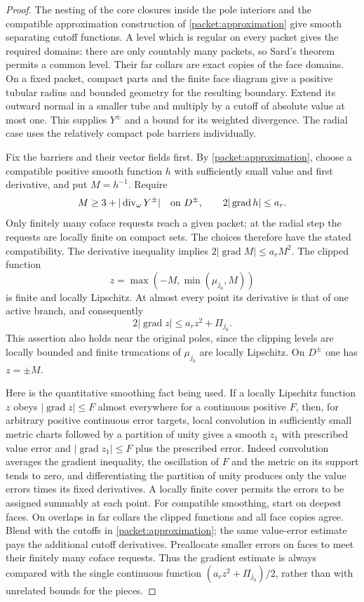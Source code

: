 \documentclass[11pt]{article}
\numberwithin{equation}{section}
\theoremstyle{definition}
\theoremstyle{remark}
\begin{document}
\begin{proof}
The nesting of the core closures inside the pole interiors and the
compatible approximation construction of \cref{packet:approximation}
give smooth separating cutoff functions.  A level which is regular on
every packet gives the required domains: there are only countably many
packets, so Sard's theorem permits a common level.  Their far collars
are exact copies of the face domains.  On a fixed packet, compact parts
and the finite face diagram give a positive tubular radius and bounded
geometry for the resulting boundary.  Extend its outward normal in a
smaller tube and multiply by a cutoff of absolute value at most one.
This supplies $Y^\pm$ and a bound for its weighted divergence.  The radial
case uses the relatively compact pole barriers individually.

Fix the barriers and their vector fields first.  By
\cref{packet:approximation}, choose a compatible positive smooth function
$h$ with sufficiently small value and first derivative, and put $M=h^{-1}$.
Require
\[
 M\ge3+|\operatorname{div}_\omega Y^\pm|\quad\hbox{on }D^\pm,
 \qquad 2|\operatorname{grad} h|\le a_r.
\]
Only finitely many coface requests reach a given packet; at the radial
step the requests are locally finite on compact sets.  The choices
therefore have the stated compatibility.  The derivative inequality implies
$2|\operatorname{grad} M|\le a_rM^2$.  The clipped function
\[
                  z=\max(-M,\min(\mu_{j_0},M))
\]
is finite and locally Lipschitz.  At almost every point its derivative is
that of one active branch, and consequently
\[
                    2|\operatorname{grad} z|\le a_r z^2+\Pi_{j_0}.
\]
This assertion also holds near the original poles, since the clipping
levels are locally bounded and finite truncations of $\mu_{j_0}$ are
locally Lipschitz.  On $D^\pm$ one has $z=\pm M$.

Here is the quantitative smoothing fact being used.  If a locally
Lipschitz function $z$ obeys $|\operatorname{grad} z|\le F$ almost everywhere for a
continuous positive $F$, then, for arbitrary positive continuous error
targets, local convolution in sufficiently small metric charts followed
by a partition of unity gives a smooth $z_1$ with prescribed value error
and $|\operatorname{grad} z_1|\le F$ plus the prescribed error.  Indeed convolution
averages the gradient inequality, the oscillation of $F$ and the metric
on its support tends to zero, and differentiating the partition of unity
produces only the value errors times its fixed derivatives.  A locally
finite cover permits the errors to be assigned summably at each point.
For compatible smoothing, start on deepest faces.  On overlaps in far
collars the clipped functions and all face copies agree.  Blend with the
cutoffs in \cref{packet:approximation}; the same value-error estimate
pays the additional cutoff derivatives.  Preallocate smaller errors on
faces to meet their finitely many coface requests.  Thus the gradient
estimate is always compared with the single continuous function
$(a_rz^2+\Pi_{j_0})/2$, rather than with unrelated bounds for the pieces.


\end{proof}
\end{document}
